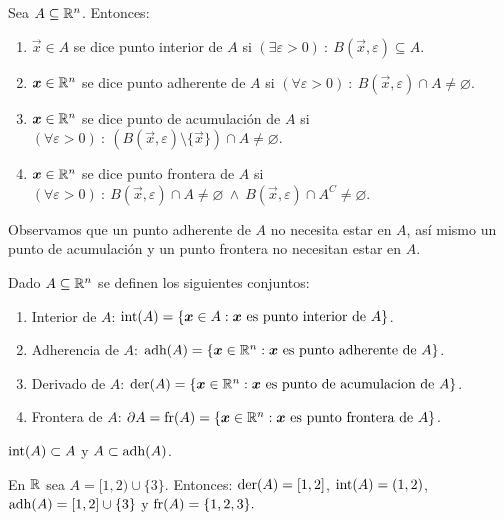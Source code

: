 \begin{definicion} Sea $A\subseteq\mathbb{R}^n$. Entonces:
\begin{enumerate}
\item $\vec{x}\in A$ se dice  punto interior de $A$ si $(\exists\varepsilon>0)\::
\: B(\vec{x},\varepsilon)\subseteq A.$
\item $\boldsymbol{x}\in\mathbb{R}^n$  se dice punto adherente de $A$ si 
$(\forall\varepsilon>0)\::\: B(\vec{x},\varepsilon)\cap A\neq\varnothing.$
\item $\boldsymbol{x}\in\mathbb{R}^n$  se dice punto de acumulaci\'on de $A$ si 
$(\forall\varepsilon>0)\::\: (B(\vec{x},\varepsilon)\setminus\{\vec{x}\})\cap A\neq\varnothing.
$
\item $\boldsymbol{x}\in\mathbb{R}^n$  se dice punto frontera de $A$ si 
$(\forall\varepsilon>0)\::\: B(\vec{x},\varepsilon)\cap A
\neq\varnothing \:\wedge \: B(\vec{x},\varepsilon)\cap A^C\neq\varnothing.
$
\end{enumerate}
\end{definicion}

Observamos que un punto adherente de $A$ no necesita estar en $A$, as\'i mismo
un punto de acumulaci\'on y un punto frontera no necesitan estar en $A$. 

\begin{definicion} Dado $A\subseteq\mathbb{R}^n$ se definen los siguientes
conjuntos:
\begin{enumerate}
\item Interior de $A$: $\text{int}({A})=\{\boldsymbol{x}\in A : \boldsymbol{x} \text{ es punto interior de } A\}$.
\item Adherencia de $A$:  $\text{adh}({A})=\{\boldsymbol{x}\in \mathbb{R}^n : \boldsymbol{x} \text{ es punto adherente de } A\}$.
\item Derivado de $A$: $\text{der}({A})=\{\boldsymbol{x}\in\mathbb{R}^n : \boldsymbol{x}  \text{ es punto de acumulacion de } A\}$.
\item Frontera de $A$: $\partial A=\text{fr}({A})=\{\boldsymbol{x}\in\mathbb{R}^n : \boldsymbol{x} \text{ es  punto frontera de } A\}$.
\end{enumerate}
\end{definicion}

\begin{nota} 
$\text{int}({A})\subset A$ y $A\subset \text{adh}({A})$.
\end{nota}

\begin{ejemplo} En $\mathbb{R}$ sea $A=[1,2)\cup \{3\}$. Entonces:
$\text{der}({A})=[1,2]$, 
$\text{int}({A})=(1,2)$, 
$\text{adh}({A})=[1,2]\cup \{3\}$ y 
$\text{fr}({A})=\{1,2,3\}.$
\end{ejemplo} 

